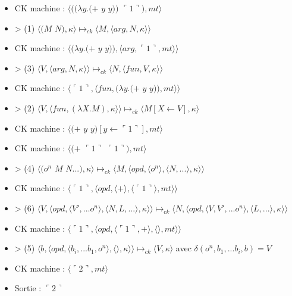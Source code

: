 \documentclass[10pt,a4paper]{article}
\begin{document}
\begin{itemize}
					\item[] CK machine : $\langle((\lambda y.(+$ $y$ $y))$ $\ulcorner 1\urcorner),mt\rangle$
					\item[] > (1) $\langle(M$ $N),\kappa\rangle \longmapsto_{ck} \langle M,\langle arg,N,\kappa\rangle\rangle$
					\item[] CK machine : $\langle(\lambda y.(+$ $y$ $y)),\langle arg,\ulcorner 1\urcorner,mt\rangle\rangle$	
					\item[] > (3) $\langle V,\langle arg,N,\kappa \rangle \rangle \longmapsto_{ck} \langle N,\langle fun,V,\kappa \rangle \rangle$
					\item[] CK machine : $\langle\ulcorner 1\urcorner,\langle fun,(\lambda y.(+$ $y$ $y)),mt\rangle\rangle$	
					\item[] > (2) $\langle V,\langle fun,(\lambda X.M),\kappa \rangle \rangle \longmapsto_{ck} \langle M[X \leftarrow V],\kappa\rangle$	
					\item[] CK machine : $\langle(+$ $y$ $y)[y \leftarrow\ulcorner 1\urcorner],mt\rangle$
					\item[] CK machine : $\langle(+$ $\ulcorner 1\urcorner$ $\ulcorner 1\urcorner),mt\rangle$
					\item[] > (4) $\langle(o^{n}$ $M$ $N...),\kappa\rangle \longmapsto_{ck} \langle M,\langle opd,\langle o^{n}\rangle,\langle N,...\rangle,\kappa\rangle\rangle$
					\item[] CK machine : $\langle\ulcorner 1\urcorner,\langle opd,\langle + \rangle,\langle\ulcorner 1\urcorner\rangle,mt\rangle\rangle$
					\item[] > (6) $\langle V,\langle opd,\langle V',...o^{n}\rangle,\langle N,L,...\rangle,\kappa\rangle\rangle \longmapsto_{ck} \langle N,\langle opd,\langle V,V',...o^{n}\rangle,\langle L,...\rangle,\kappa\rangle\rangle$
					\item[] CK machine : $\langle\ulcorner 1\urcorner,\langle opd,\langle\ulcorner 1\urcorner,+ \rangle,\langle\rangle,mt\rangle\rangle$
					\item[] > (5) $\langle b,\langle opd,\langle b_{i},...b_{1},o^{n}\rangle,\langle\rangle,\kappa\rangle\rangle \longmapsto_{ck} \langle V,\kappa\rangle$ avec $\delta(o^{n},b_{1},...b_{i},b) = V$
					\item[] CK machine : $\langle\ulcorner 2\urcorner,mt\rangle$
					\item[] \smallbreak
					Sortie : $\ulcorner 2\urcorner$
				\end{itemize}
				\newpage
				
				
				
\end{document}

